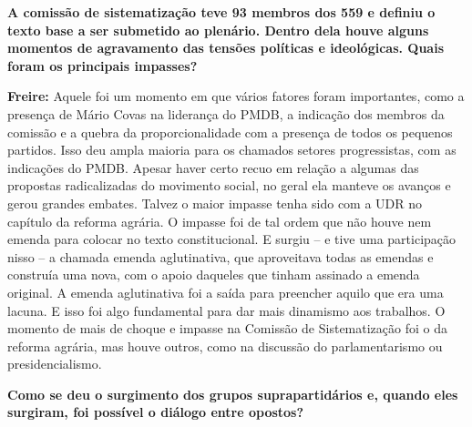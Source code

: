 \textbf{A comissão de sistematização teve 93 membros dos 559 e definiu o
texto base a ser submetido ao plenário. Dentro dela houve alguns
momentos de agravamento das tensões políticas e ideológicas. Quais foram
os principais impasses?}

\textbf{Freire:} Aquele foi um momento em que vários fatores foram
importantes, como a presença de Mário Covas na liderança do PMDB, a
indicação dos membros da comissão e a quebra da proporcionalidade com a
presença de todos os pequenos partidos. Isso deu ampla maioria para os
chamados setores progressistas, com as indicações do PMDB. Apesar haver
certo recuo em relação a algumas das propostas radicalizadas do
movimento social, no geral ela manteve os avanços e gerou grandes
embates. Talvez o maior impasse tenha sido com a UDR no capítulo da
reforma agrária. O impasse foi de tal ordem que não houve nem emenda
para colocar no texto constitucional. E surgiu -- e tive uma
participação nisso -- a chamada emenda aglutinativa, que aproveitava
todas as emendas e construía uma nova, com o apoio daqueles que tinham
assinado a emenda original. A emenda aglutinativa foi a saída para
preencher aquilo que era uma lacuna. E isso foi algo fundamental para
dar mais dinamismo aos trabalhos. O momento de mais de choque e impasse
na Comissão de Sistematização foi o da reforma agrária, mas houve
outros, como na discussão do parlamentarismo ou presidencialismo.

\textbf{Como se deu o surgimento dos grupos suprapartidários e, quando
eles surgiram, foi possível o diálogo entre opostos?}

